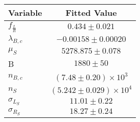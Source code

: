 \begin{tabular}[t]{lc}
\hline
Variable &Fitted Value\\
\hline\hline
$f_{\frac{L}{R}}$&$0.434\pm0.021$\\
\hline
$\lambda_{B,c}$&$-0.00158\pm0.00020$\\
\hline
$\mu_S$&$5278.875\pm0.078$\\
\hline
B&$1880\pm50$\\
\hline
$n_{B,c}$&$(7.48\pm0.20)\times 10^3$\\
\hline
$n_S$&$(5.242\pm0.029)\times 10^4$\\
\hline
$\sigma_{L_S}$&$11.01\pm0.22$\\
\hline
$\sigma_{R_S}$&$18.27\pm0.24$\\
\hline
\end{tabular}